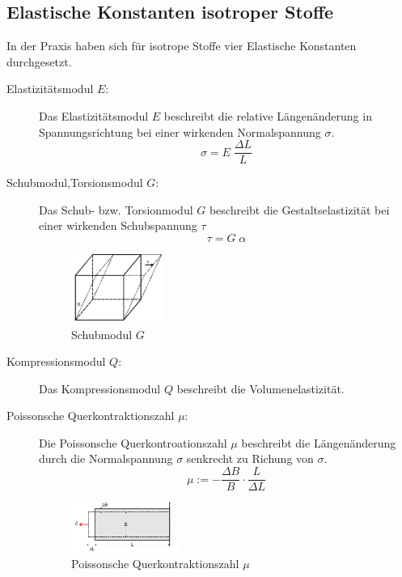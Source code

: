 \subsection{Elastische Konstanten isotroper Stoffe}
In der Praxis haben sich für isotrope Stoffe vier Elastische Konstanten durchgesetzt.\\
\begin{description}
\item[Elastizitätsmodul $E$:]
    Das Elastizitätsmodul $E$ beschreibt die relative Längenänderung in Spannungsrichtung
    bei einer wirkenden Normalspannung $\sigma$.
    \begin{equation}
        \sigma = E \; \frac{\Delta L}{L}
        \label{eqn:def_elastizitätsmodul}
    \end{equation}

\item[Schubmodul,Torsionsmodul $G$:]
    Das Schub- bzw. Torsionmodul $G$ beschreibt die Gestaltselastizität bei einer
    wirkenden Schubspannung $\tau$
    \begin{equation}
        \tau = G \; \alpha
        \label{eqn:def_schubmodul}
    \end{equation}
    
    \begin{figure}[h]
        \centering
        \includegraphics[width=0.3\textwidth, height=0.2\textwidth]{bilder/Schubmodul.jpg}
        \caption{Schubmodul $G$}        
        \label{fig:schubmodul}
    \end{figure}

\item[Kompressionsmodul $Q$:]
    Das Kompressionsmodul $Q$ beschreibt die Volumenelastizität.

\newpage
\item[Poissonsche Querkontraktionszahl $\mu$:]
    Die Poissonsche Querkontroationszahl $\mu$ beschreibt die Längenänderung durch die Normalspannung $\sigma$
    senkrecht zu Richung von $\sigma$.
    \begin{equation}
        \mu := -\frac{\Delta B}{B} \cdot \frac{L}{\Delta L}
        \label{eqn:def_poissonsche}
    \end{equation}
    
    \begin{figure}[h]
        \centering
        \includegraphics[width=0.35\textwidth, height=0.15\textwidth]{bilder/Poissonsche_Quer.jpg}
        \caption{Poissonsche Querkontraktionszahl $\mu$}        
        \label{fig:poissonsche_Quer}
    \end{figure}
\end{description}


